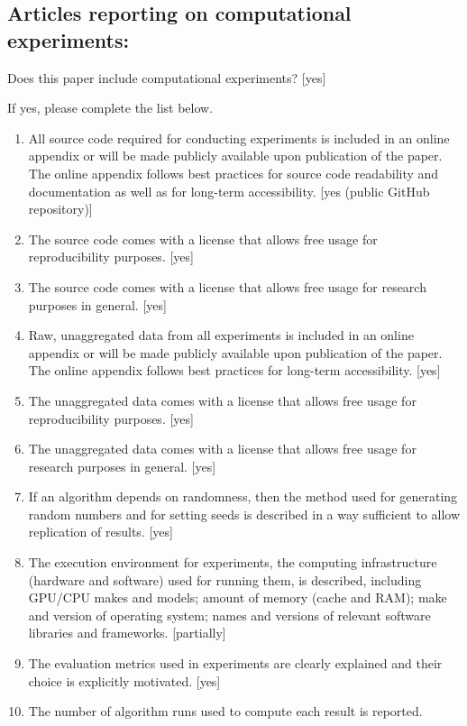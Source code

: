 \subsection*{Articles reporting on computational experiments:}
Does this paper include computational experiments? [yes]

If yes, please complete the list below.
\begin{enumerate}
    \item
    All source code required for conducting experiments is included in an online appendix
    or will be made publicly available upon publication of the paper.
    The online appendix follows best practices for source code readability and documentation as well as for long-term accessibility.
    [yes (public GitHub repository)]
    \item The source code comes with a license that
    allows free usage for reproducibility purposes.
    [yes]
    \item The source code comes with a license that
    allows free usage for research purposes in general.
    [yes]
    \item
    Raw, unaggregated data from all experiments is included in an online appendix
    or will be made publicly available upon publication of the paper.
    The online appendix follows best practices for long-term accessibility.
    [yes]
    \item The unaggregated data comes with a license that
    allows free usage for reproducibility purposes.
    [yes]
    \item The unaggregated data comes with a license that
    allows free usage for research purposes in general.
    [yes]
    \item If an algorithm depends on randomness, then the method used for generating random numbers and for setting seeds is described in a way sufficient to allow replication of results.
    [yes]
    \item The execution environment for experiments, the computing infrastructure (hardware and software) used for running them, is described, including GPU/CPU makes and models; amount of memory (cache and RAM); make and version of operating system; names and versions of relevant software libraries and frameworks.
    [partially]
    \item
    The evaluation metrics used in experiments are clearly explained and their choice is explicitly motivated.
    [yes]
    \item
    The number of algorithm runs used to compute each result is reported.

\end{enumerate}
